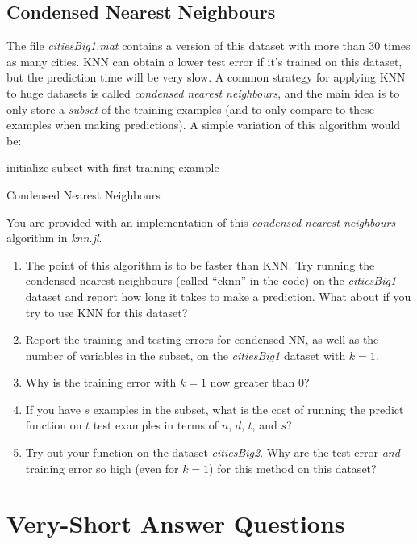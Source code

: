 \documentclass{article}
\def\blu#1{{\color{blu}#1}}
\def\enum#1{\begin{enumerate}#1\end{enumerate}}
\begin{document}
\subsection{Condensed Nearest Neighbours}

The file \emph{citiesBig1.mat} contains a version of this dataset with more than 30 times as many cities. KNN can obtain a lower test error if it's trained on this dataset, but the prediction time will be very slow. A common strategy for applying KNN to huge datasets is called \emph{condensed nearest neighbours}, and the main idea is to only store a \emph{subset} of the training examples (and to only compare to these examples when making predictions). A simple variation of this algorithm would be:

\begin{algorithm}[H]
 initialize subset with first training example\;
 \caption{Condensed Nearest Neighbours}
\end{algorithm}
You are provided with an implementation of this \emph{condensed nearest neighbours} algorithm in \emph{knn.jl}. 
\blu{
\enum{
\item The point of this algorithm is to be faster than KNN. Try running the condensed nearest neighbours (called ``cknn'' in the code) on the \emph{citiesBig1} dataset and report how long it takes to make a prediction. What about if you try to use KNN for this dataset?
\item Report the training and testing errors for condensed NN, as well as the number of variables in the subset, on the \emph{citiesBig1} dataset with $k=1$.
\item Why is the training error with $k=1$ now greater than $0$?
\item If you have $s$ examples in the subset, what is the cost of running the predict function on $t$ test examples in terms of $n$, $d$, $t$, and $s$?
\item Try out your function on the dataset \emph{citiesBig2}. Why are the  test error \emph{and} training error so high (even for $k=1$) for this method on this dataset?
}
}


\section{Very-Short Answer Questions}
\end{document}
